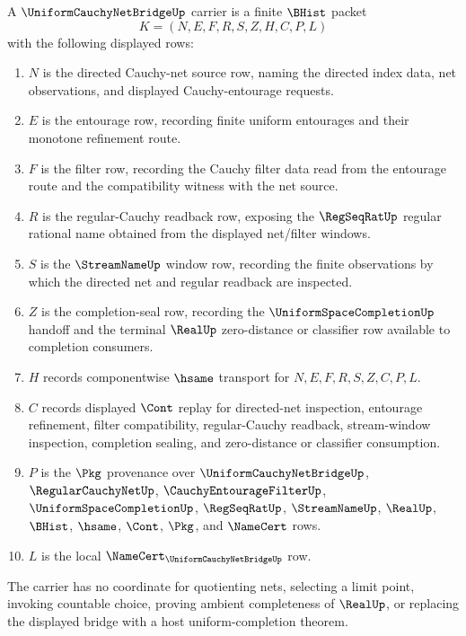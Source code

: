 \begin{definition}
\label{def:uniform-cauchy-net-bridge-carrier}
A $\UniformCauchyNetBridgeUp$ carrier is a finite $\BHist$ packet
$$
K=(N,E,F,R,S,Z,H,C,P,L)
$$
with the following displayed rows:
\begin{enumerate}
\item $N$ is the directed Cauchy-net source row, naming the directed index data, net observations, and displayed Cauchy-entourage requests.
\item $E$ is the entourage row, recording finite uniform entourages and their monotone refinement route.
\item $F$ is the filter row, recording the Cauchy filter data read from the entourage route and the compatibility witness with the net source.
\item $R$ is the regular-Cauchy readback row, exposing the $\RegSeqRatUp$ regular rational name obtained from the displayed net/filter windows.
\item $S$ is the $\StreamNameUp$ window row, recording the finite observations by which the directed net and regular readback are inspected.
\item $Z$ is the completion-seal row, recording the $\UniformSpaceCompletionUp$ handoff and the terminal $\RealUp$ zero-distance or classifier row available to completion consumers.
\item $H$ records componentwise $\hsame$ transport for $N,E,F,R,S,Z,C,P,L$.
\item $C$ records displayed $\Cont$ replay for directed-net inspection, entourage refinement, filter compatibility, regular-Cauchy readback, stream-window inspection, completion sealing, and zero-distance or classifier consumption.
\item $P$ is the $\Pkg$ provenance over $\UniformCauchyNetBridgeUp$, $\RegularCauchyNetUp$, $\CauchyEntourageFilterUp$, $\UniformSpaceCompletionUp$, $\RegSeqRatUp$, $\StreamNameUp$, $\RealUp$, $\BHist$, $\hsame$, $\Cont$, $\Pkg$, and $\NameCert$ rows.
\item $L$ is the local $\NameCert_{\UniformCauchyNetBridgeUp}$ row.
\end{enumerate}
The carrier has no coordinate for quotienting nets, selecting a limit point, invoking countable choice, proving ambient completeness of $\RealUp$, or replacing the displayed bridge with a host uniform-completion theorem.
\end{definition}

